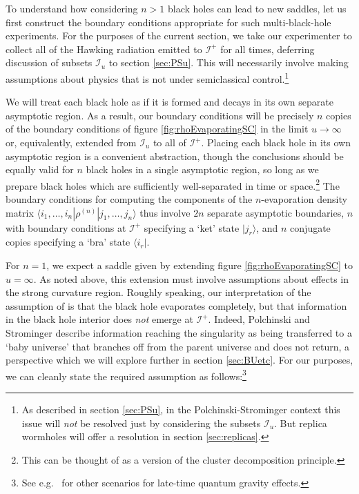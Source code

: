 \documentclass[letterpaper,12pt]{article}
\newcommand*{\scri}{\mathscr{I}} %
\begin{document}
To understand how considering $n>1$ black holes can lead to new saddles, let us first construct the boundary conditions appropriate for such multi-black-hole experiments. For the purposes of the current section, we take our experimenter to collect all of the Hawking radiation emitted to $\scri^+$ for all times, deferring discussion of subsets $\scri_u$ to section \ref{sec:PSu}.  This will necessarily involve making assumptions about physics that is not under semiclassical control.\footnote{As described in section \ref{sec:PSu}, in the Polchinski-Strominger context this issue will \emph{not} be resolved just by considering the subsets $\scri_u$.  But replica wormholes will offer a resolution in section \ref{sec:replicas}.}



We will treat each black hole as if it is formed and decays in its own separate asymptotic region.  As a result, our boundary conditions will be precisely $n$ copies of the boundary conditions of figure \ref{fig:rhoEvaporatingSC} in the limit $u\rightarrow \infty$ or, equivalently, extended from $\scri_u$ to all of $\scri^+$.  Placing each black hole in its own asymptotic region is a convenient abstraction, though the conclusions should be equally valid for $n$ black holes in a single asymptotic region, so long as we prepare black holes which are sufficiently well-separated in time or space.\footnote{This can be thought of as a version of the cluster decomposition principle.} The boundary conditions for computing the components of the $n$-evaporation density matrix $\langle i_1,\ldots,i_n|\rho^{(n)}|j_1,\ldots,j_n\rangle$ thus involve $2n$ separate asymptotic boundaries, $n$ with boundary conditions at $\scri^+$ specifying a `ket' state $|j_r\rangle$, and $n$ conjugate copies specifying a `bra' state $\langle i_r|$.

For $n=1$, we expect a saddle given by extending figure \ref{fig:rhoEvaporatingSC} to $u = \infty$.  As noted above, this extension must involve assumptions about effects in the strong curvature region.
Roughly speaking, our interpretation of the assumption of \cite{Polchinski:1994zs} is that the black hole evaporates completely, but that information in the black hole interior does \emph{not} emerge at $\scri^+$.  Indeed, Polchinski and Strominger describe information reaching the singularity as being transferred to a `baby universe' that branches off from the parent universe and does not return, a perspective which we will explore further in section \ref{sec:BUetc}.  For our purposes, we can cleanly state the required assumption as follows:\footnote{See e.g.\ \cite{Giddings:1992hh,Ashtekar:2005cj,Ashtekar:2008jd,Bianchi:2018mml,DAmbrosio:2020mut}    for other scenarios for late-time quantum gravity effects.}%
\end{document}
